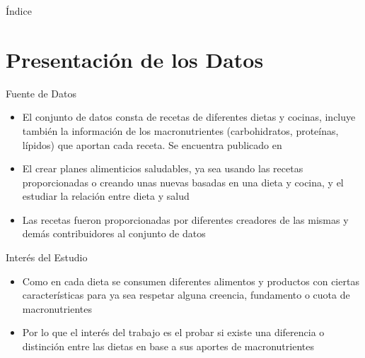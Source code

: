 \documentclass{beamer}
\begin{document}
    \begin{frame}[plain]{Índice}
        \tableofcontents
    \end{frame}

    \section{Presentación de los Datos}

    \begin{frame}{Fuente de Datos}
        \begin{itemize}
            \item<1->El conjunto de datos consta de recetas 
            de diferentes dietas y cocinas, incluye también 
            la información de los macronutrientes (carbohidratos, 
            proteínas, lípidos) que aportan cada receta. Se 
            encuentra publicado en \cite{dataset_macronutrients}
            \item<2->El crear planes alimenticios saludables, ya 
            sea usando las recetas proporcionadas o creando unas 
            nuevas basadas en una dieta y cocina, y el estudiar 
            la relación entre dieta y salud
            \item<3->Las recetas fueron proporcionadas por 
            diferentes creadores de las mismas y demás 
            contribuidores al conjunto de datos
        \end{itemize}
    \end{frame}

    \begin{frame}{Interés del Estudio}
        \begin{itemize}
            \item<1->\cite{marvastipopular}Como en cada dieta se consumen diferentes 
            alimentos y productos con ciertas características 
            para ya sea respetar alguna creencia, fundamento o 
            cuota de macronutrientes
            \item<2->Por lo que el interés del trabajo 
            es el probar si existe una diferencia o distinción 
            entre las dietas en base a sus aportes de macronutrientes
        \end{itemize}
    \end{frame}
\end{document}
